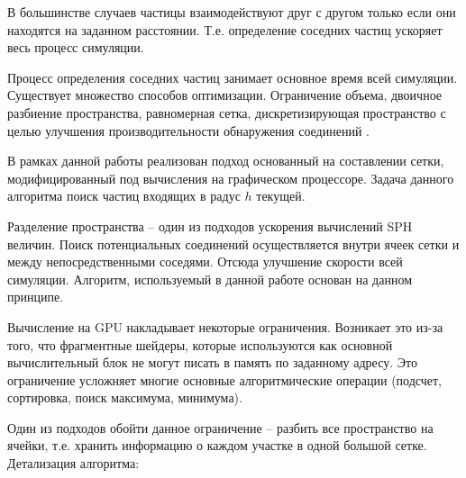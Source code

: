 В большинстве случаев частицы взаимодействуют друг с другом только если они находятся на 
заданном расстоянии. Т.е. определение соседних частиц ускоряет весь процесс симуляции.

Процесс определения соседних частиц занимает основное время всей симуляции. Существует
множество способов оптимизации. Ограничение объема, двоичное разбиение пространства, 
равномерная сетка, дискретизирующая пространство с целью улучшения производительности 
обнаружения соединений \cite{neisearch}.

В рамках данной работы реализован подход основанный на составлении сетки, модифицированный
под вычисления на графическом процессоре. Задача данного алгоритма поиск частиц входящих в 
радус $h$ текущей.

Разделение пространства -- один из подходов ускорения вычислений SPH величин.
Поиск потенциальных соединений осуществляется внутри ячеек сетки и между непосредственными 
соседями. Отсюда улучшение скорости всей симуляции. Алгоритм, используемый в данной работе
основан на данном принципе. 

Вычисление на GPU накладывает некоторые ограничения. Возникает это из-за того, что 
фрагментные шейдеры, которые используются как основной вычислительный блок не могут
писать в память по заданному адресу. Это ограничение усложняет многие основные
алгоритмические операции (подсчет, сортировка, поиск максимума, минимума).  

Один из подходов обойти данное ограничение -- разбить все пространство на ячейки, т.е.
хранить информацию о каждом участке в одной большой сетке.  \\

Детализация алгоритма:

